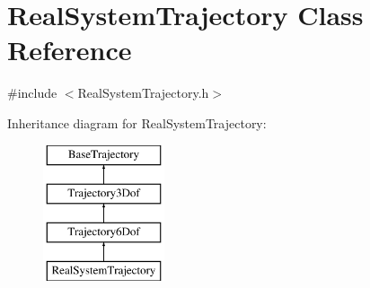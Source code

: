 \hypertarget{class_real_system_trajectory}{}\section{Real\+System\+Trajectory Class Reference}
\label{class_real_system_trajectory}


{\ttfamily \#include $<$Real\+System\+Trajectory.\+h$>$}

Inheritance diagram for Real\+System\+Trajectory\+:\begin{figure}[H]
\begin{center}
\leavevmode
\includegraphics[height=4.000000cm]{class_real_system_trajectory}
\end{center}
\end{figure}
